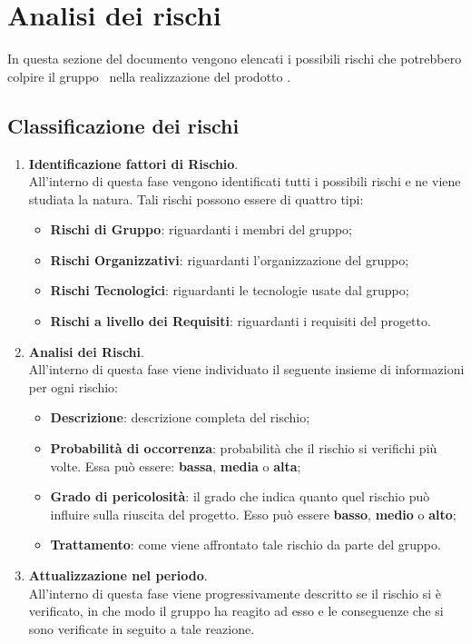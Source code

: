 \newpage
\section{Analisi dei rischi}

In questa sezione del documento vengono elencati i possibili rischi che potrebbero colpire il gruppo \gruppo\ nella realizzazione del prodotto \progetto.

\subsection{Classificazione dei rischi}

\begin{enumerate}
		
\item \textbf{Identificazione fattori di Rischio}. \\ 
	  All'interno di questa fase vengono identificati tutti i possibili rischi e ne viene studiata la natura. Tali rischi possono essere di quattro tipi:
	\begin{itemize}
	\item \textbf{Rischi di Gruppo}: riguardanti i membri del gruppo; 
	\item \textbf{Rischi Organizzativi}: riguardanti l'organizzazione del gruppo;
	\item \textbf{Rischi Tecnologici}: riguardanti le tecnologie usate dal gruppo;
	\item \textbf{Rischi a livello dei Requisiti}: riguardanti i requisiti del progetto.
	\end{itemize}
				
\item \textbf{Analisi dei Rischi}. \\
	  All'interno di questa fase viene individuato il seguente insieme di informazioni per ogni rischio: 
	\begin{itemize}
	\item \textbf{Descrizione}: descrizione completa del rischio;
	\item \textbf{Probabilità di occorrenza}: probabilità che il rischio si verifichi più volte. Essa può essere: \textbf{bassa}, \textbf{media} o \textbf{alta};
	\item \textbf{Grado di pericolosità}: il grado che indica quanto quel rischio può influire sulla riuscita del progetto. Esso può essere \textbf{basso}, \textbf{medio} o \textbf{alto};
	\item \textbf{Trattamento}: come viene affrontato tale rischio da parte del gruppo.	
	\end{itemize}

\item \textbf{Attualizzazione nel periodo}. \\
	  All'interno di questa fase viene progressivamente descritto se il rischio si è verificato, in che modo il gruppo ha reagito ad esso e le conseguenze che si sono verificate in seguito a tale reazione.

\end{enumerate}

